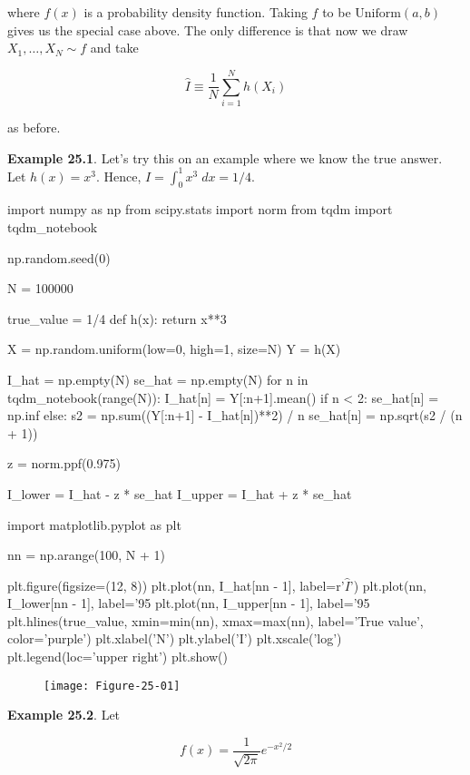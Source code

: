 where \(f(x)\) is a probability density function. Taking \(f\) to be
\(\text{Uniform}(a, b)\) gives us the special case above. The only
difference is that now we draw \(X_1, \dots, X_N \sim f\) and take

\[ \hat{I} \equiv \frac{1}{N} \sum_{i=1}^N h(X_i) \]

as before.

\textbf{Example 25.1}. Let's try this on an example where we know the
true answer. Let \(h(x) = x^3\). Hence, \(I = \int_0^1 x^3\;dx = 1/4\).

\begin{python}
import numpy as np
from scipy.stats import norm
from tqdm import tqdm_notebook

np.random.seed(0)

N = 100000

true_value = 1/4
def h(x):
    return x**3

X = np.random.uniform(low=0, high=1, size=N)
Y = h(X)

I_hat = np.empty(N)
se_hat = np.empty(N)
for n in tqdm_notebook(range(N)):
    I_hat[n] = Y[:n+1].mean()
    if n < 2:
        se_hat[n] = np.inf
    else:
        s2 = np.sum((Y[:n+1] - I_hat[n])**2) / n
        se_hat[n] = np.sqrt(s2 / (n + 1))

        
z = norm.ppf(0.975)

I_lower = I_hat - z * se_hat
I_upper = I_hat + z * se_hat
\end{python}

\begin{python}
import matplotlib.pyplot as plt

nn = np.arange(100, N + 1)

plt.figure(figsize=(12, 8))
plt.plot(nn, I_hat[nn - 1], label=r'$\hat{I}$')
plt.plot(nn, I_lower[nn - 1], label='95%
plt.plot(nn, I_upper[nn - 1], label='95%
plt.hlines(true_value, xmin=min(nn), xmax=max(nn), label='True value', color='purple')
plt.xlabel('N')
plt.ylabel('I')
plt.xscale('log')
plt.legend(loc='upper right')
plt.show()
\end{python}

\begin{figure}[H]
\texttt{[image: Figure-25-01]}
\end{figure}

\textbf{Example 25.2}. Let

\[ f(x) = \frac{1}{\sqrt{2 \pi}} e^{-x^2 / 2} \]

